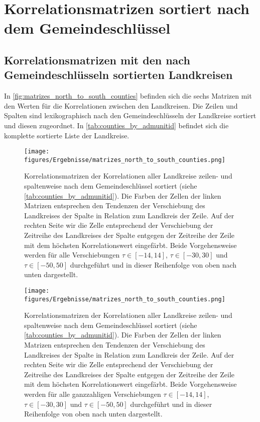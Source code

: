 \section{Korrelationsmatrizen sortiert nach dem Gemeindeschlüssel}
\subsection{Korrelationsmatrizen mit den nach Gemeindeschlüsseln sortierten Landkreisen}
In \autoref{fig:matrizes_north_to_south_counties} befinden sich die sechs Matrizen mit den Werten für die Korrelationen zwischen den Landkreisen.
Die Zeilen und Spalten sind lexikographisch nach den Gemeindeschlüsseln der Landkreise sortiert und diesen zugeordnet. In \autoref{tab:counties_by_admunitid} befindet sich die komplette sortierte Liste der Landkreise.
\begin{figure}[H]
    \centering
    \texttt{[image: figures/Ergebnisse/matrizes\_north\_to\_south\_counties.png]}
    \caption{Korrelationsmatrizen der Korrelationen aller Landkreise zeilen- und spaltenweise nach dem Gemeindeschlüssel sortiert (siehe \autoref{tab:counties_by_admunitid}). Die Farben der Zellen der linken Matrizen entsprechen den Tendenzen der Verschiebung des Landkreises der Spalte in Relation zum Landkreis der Zeile.
    Auf der rechten Seite wir die Zelle entsprechend der Verschiebung der Zeitreihe des Landkreises der Spalte entgegen der Zeitreihe der Zeile mit dem höchsten Korrelationswert eingefärbt. Beide Vorgehensweise werden für alle Verschiebungen $\tau\in[-14,14]$,  $\tau\in[-30,30]$ und  $\tau\in[-50,50]$ durchgeführt und in dieser Reihenfolge von oben nach unten dargestellt.}
\end{figure}

\begin{figure}[H]
    \centering
    \texttt{[image: figures/Ergebnisse/matrizes\_north\_to\_south\_counties.png]}
    \caption{Korrelationsmatrizen der Korrelationen aller Landkreise zeilen- und spaltenweise nach dem Gemeindeschlüssel sortiert (siehe \autoref{tab:counties_by_admunitid}). Die Farben der Zellen der linken Matrizen entsprechen den Tendenzen der Verschiebung des Landkreises der Spalte in Relation zum Landkreis der Zeile.
    Auf der rechten Seite wir die Zelle entsprechend der Verschiebung der Zeitreihe des Landkreises der Spalte entgegen der Zeitreihe der Zeile mit dem höchsten Korrelationswert eingefärbt. Beide Vorgehensweise werden für alle ganzzahligen Verschiebungen $\tau\in[-14,14]$,  $\tau\in[-30,30]$ und  $\tau\in[-50,50]$ durchgeführt und in dieser Reihenfolge von oben nach unten dargestellt.}
    \label{fig:matrizes_north_to_south_counties}
\end{figure}
